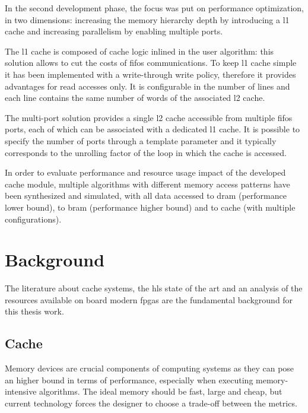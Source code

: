 \documentclass[11pt,a4paper,oneside]{memoir}
\begin{document}
\bigskip
In the second development phase, the focus was put on performance optimization,
in two dimensions: increasing the memory hierarchy depth by introducing a
\ac{l1} cache and increasing parallelism by enabling multiple ports.

The \ac{l1} cache is composed of cache logic inlined in the user algorithm: this
solution allows to cut the costs of \acp{fifo} communications. To keep \ac{l1}
cache simple it has been implemented with a write-through write policy,
therefore it provides advantages for read accesses only. It is configurable in
the number of lines and each line contains the same number of words of the
associated \ac{l2} cache.

The multi-port solution provides a single \ac{l2} cache accessible from multiple
\acp{fifo} ports, each of which can be associated with a dedicated \ac{l1}
cache.
It is possible to specify the number of ports through a template parameter and
it typically corresponds to the unrolling factor of the loop in which the cache
is accessed.

\bigskip
In order to evaluate performance and resource usage impact of the developed
cache module, multiple algorithms with different memory access patterns have
been synthesized and simulated, with all data accessed to \ac{dram} (performance
lower bound), to \ac{bram} (performance higher bound) and to cache (with
multiple configurations).

\vfill
\pagebreak

\tableofcontents*
\vfill
\pagebreak

\listoffigures
\vfill
\pagebreak

\listoftables
\vfill
\pagebreak

\printacronyms[heading=chapter,name={List of Acronyms}]
\vfill
\pagebreak

\clearpage
\pagestyle{centerruled}

\mainmatter
\chapter{Background}
The literature about cache systems, the \acl{hls} state of the art and an
analysis of the resources available on board modern \acp{fpga} are the
fundamental background for this thesis work.

\section{Cache}
Memory devices are crucial components of computing systems as they can pose an
higher bound in terms of performance, especially when executing memory-intensive
algorithms.
The ideal memory should be fast, large and cheap, but current technology forces
the designer to choose a trade-off between the metrics.
\end{document}

